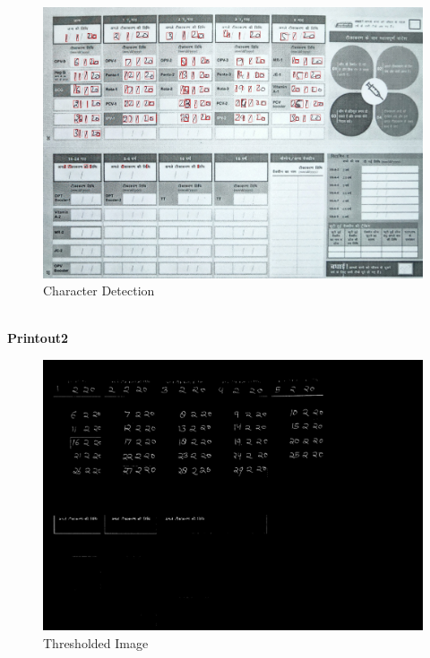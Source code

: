 \documentclass{article}
\begin{document}
    \begin{figure}[!htb]
    \minipage{\textwidth}
    \begin{center}
      \includegraphics[scale=.25]{4/.report/_char/p1.jpg}
      \caption{Character Detection}
    \end{center}
    \endminipage
    \end{figure}
\pagebreak \\
\textbf{Printout2}
    \begin{figure}[!htb]
    \minipage{\textwidth}
    \begin{center}
      \includegraphics[scale=.25]{4/.report/_thresh/p2.jpg}
      \caption{Thresholded Image}
    \end{center}
    \endminipage
    \end{figure}
\end{document}
